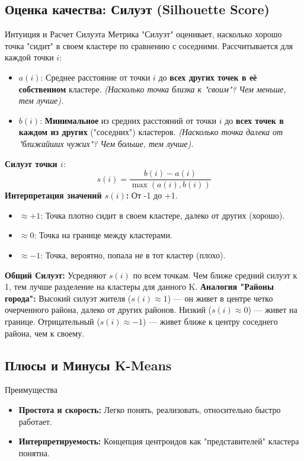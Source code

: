 \subsection{Оценка качества: Силуэт (Silhouette Score)}
\begin{myexampleblock}{Интуиция и Расчет Силуэта}
    Метрика "Силуэт" оценивает, насколько хорошо точка "сидит" в своем кластере по сравнению с соседними. Рассчитывается для каждой точки $i$:
    \begin{itemize}
        \item $a(i)$: Среднее расстояние от точки $i$ до \textbf{всех других точек в её собственном} кластере. \textit{(Насколько точка близка к "своим"? Чем меньше, тем лучше).}
        \item $b(i)$: \textbf{Минимальное} из средних расстояний от точки $i$ до \textbf{всех точек в каждом из других} ("соседних") кластеров. \textit{(Насколько точка далека от "ближайших чужих"? Чем больше, тем лучше).}
    \end{itemize}
    \textbf{Силуэт точки $i$}: \[ s(i) = \frac{b(i) - a(i)}{\max(a(i), b(i))} \]
    \textbf{Интерпретация значений $s(i)$:} От -1 до +1.
    \begin{itemize}
        \item $\approx +1$: Точка плотно сидит в своем кластере, далеко от других (хорошо).
        \item $\approx 0$: Точка на границе между кластерами.
        \item $\approx -1$: Точка, вероятно, попала не в тот кластер (плохо).
    \end{itemize}
    \textbf{Общий Силуэт:} Усредняют $s(i)$ по всем точкам. Чем ближе средний силуэт к 1, тем лучше разделение на кластеры для данного K.
    \vspace{0.5ex}
    \textbf{Аналогия "Районы города":} Высокий силуэт жителя ($s(i) \approx 1$) — он живет в центре четко очерченного района, далеко от других районов. Низкий ($s(i) \approx 0$) — живет на границе. Отрицательный ($s(i) \approx -1$) — живет ближе к центру соседнего района, чем к своему.
\end{myexampleblock}

\subsection{Плюсы и Минусы K-Means}
\begin{textbox}{Преимущества}
    \begin{itemize}
        \item \textbf{Простота и скорость:} Легко понять, реализовать, относительно быстро работает.
        \item \textbf{Интерпретируемость:} Концепция центроидов как "представителей" кластера понятна.
    \end{itemize}
\end{textbox}

